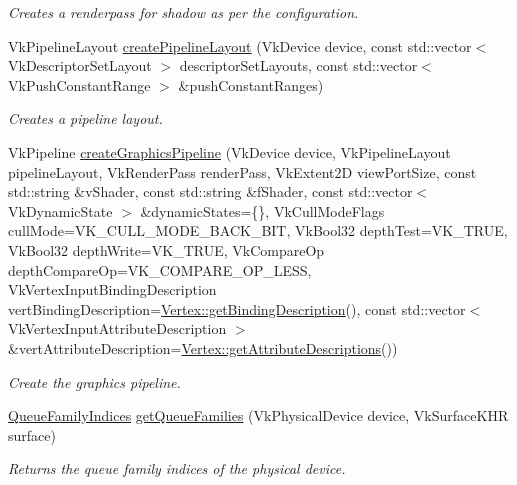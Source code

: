 \begin{DoxyCompactItemize}
\begin{DoxyCompactList}\small\item\em Creates a renderpass for shadow as per the configuration. \end{DoxyCompactList}\item 
Vk\+Pipeline\+Layout \hyperlink{namespaceblaze_1_1util_ad61009184ca26f9847dbf7d3d025ce8b}{create\+Pipeline\+Layout} (Vk\+Device device, const std\+::vector$<$ Vk\+Descriptor\+Set\+Layout $>$ descriptor\+Set\+Layouts, const std\+::vector$<$ Vk\+Push\+Constant\+Range $>$ \&push\+Constant\+Ranges)
\begin{DoxyCompactList}\small\item\em Creates a pipeline layout. \end{DoxyCompactList}\item 
Vk\+Pipeline \hyperlink{namespaceblaze_1_1util_a601f0f6b171e21ad20e0d4a384fdba6c}{create\+Graphics\+Pipeline} (Vk\+Device device, Vk\+Pipeline\+Layout pipeline\+Layout, Vk\+Render\+Pass render\+Pass, Vk\+Extent2D view\+Port\+Size, const std\+::string \&v\+Shader, const std\+::string \&f\+Shader, const std\+::vector$<$ Vk\+Dynamic\+State $>$ \&dynamic\+States=\{\}, Vk\+Cull\+Mode\+Flags cull\+Mode=V\+K\+\_\+\+C\+U\+L\+L\+\_\+\+M\+O\+D\+E\+\_\+\+B\+A\+C\+K\+\_\+\+B\+IT, Vk\+Bool32 depth\+Test=V\+K\+\_\+\+T\+R\+UE, Vk\+Bool32 depth\+Write=V\+K\+\_\+\+T\+R\+UE, Vk\+Compare\+Op depth\+Compare\+Op=V\+K\+\_\+\+C\+O\+M\+P\+A\+R\+E\+\_\+\+O\+P\+\_\+\+L\+E\+SS, Vk\+Vertex\+Input\+Binding\+Description vert\+Binding\+Description=\hyperlink{structblaze_1_1Vertex_a81e9b6e602df735ad45fcc5d2c3305c6}{Vertex\+::get\+Binding\+Description}(), const std\+::vector$<$ Vk\+Vertex\+Input\+Attribute\+Description $>$ \&vert\+Attribute\+Description=\hyperlink{structblaze_1_1Vertex_aa9ee165c3cfdac311ca8ffc382524d4b}{Vertex\+::get\+Attribute\+Descriptions}())
\begin{DoxyCompactList}\small\item\em Create the graphics pipeline. \end{DoxyCompactList}\item 
\hyperlink{structblaze_1_1util_1_1QueueFamilyIndices}{Queue\+Family\+Indices} \hyperlink{namespaceblaze_1_1util_a8ecc9f88fa3db013b808a859e07eb944}{get\+Queue\+Families} (Vk\+Physical\+Device device, Vk\+Surface\+K\+HR surface)
\begin{DoxyCompactList}\small\item\em Returns the queue family indices of the physical device. \end{DoxyCompactList}\item 

\end{DoxyCompactItemize}
